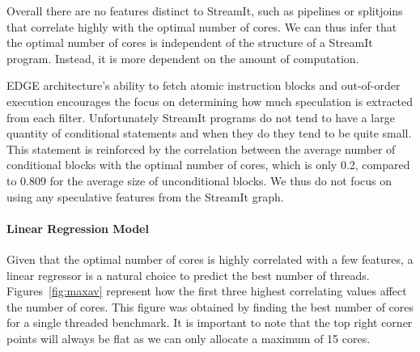 Overall there are no features distinct to StreamIt, such as pipelines or splitjoins that correlate highly with the optimal number of cores.
We can thus infer that the optimal number of cores is independent of the structure of a StreamIt program.
Instead, it is more dependent on the amount of computation.

EDGE architecture's ability to fetch atomic instruction blocks and out-of-order execution encourages the focus on determining how much speculation is extracted from each filter.
Unfortunately StreamIt programs do not tend to have a large quantity of conditional statements and when they do they tend to be quite small.
This statement is reinforced by the correlation between the average number of conditional blocks with the optimal number of cores, which is only 0.2, compared to 0.809 for the average size of unconditional blocks.
We thus do not focus on using any speculative features from the StreamIt graph.
\vspace{2mm}

\paragraph{Linear Regression Model}
Given that the optimal number of cores is highly correlated with a few features, a linear regressor is a natural choice to predict the best number of threads.
Figures~\ref{fig:maxav} represent how the first three highest correlating values affect the number of cores.
This figure was obtained by finding the best number of cores for a single threaded benchmark.
It is important to note that the top right corner points will always be flat as we can only allocate a maximum of 15 cores.

\vspace{-2mm}
